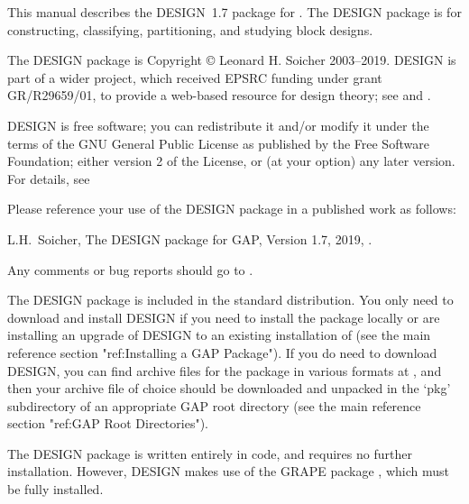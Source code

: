 %
%
%
%
\def\GRAPE{\sf GRAPE}
\def\DESIGN{\sf DESIGN}
\def\GAPDoc{\sf GAPDoc}
\def\nauty{\it nauty}
\def\Aut{{\rm Aut}\,} 


This manual describes the {\DESIGN}~1.7 package for {\GAP}.  The {\DESIGN}
package is for constructing, classifying, partitioning, and studying
block designs. 

The {\DESIGN} package is Copyright {\copyright} Leonard H. Soicher
2003--2019.  {\DESIGN} is part of a wider project, which received EPSRC
funding under grant GR/R29659/01, to provide a web-based resource for
design theory; see  and \cite{Dotw}.

{\DESIGN} is free software; you can redistribute it and/or modify
it under the terms of the GNU General Public License as published by
the Free Software Foundation; either version 2 of the License, or
(at your option) any later version. For details, see 

Please reference your use of the {\DESIGN} package in a published work
as follows:

L.H.~Soicher, The DESIGN package for GAP, Version 1.7, 2019,
.

Any comments or bug reports should go to
.


The {\DESIGN} package is included in the standard {\GAP}
distribution. You only need to download and install {\DESIGN} if you need
to install the package locally or are installing an upgrade of {\DESIGN}
to an existing installation of {\GAP} (see the main {\GAP} reference
section "ref:Installing a GAP Package").  If you do need to download
{\DESIGN}, you can find archive files for the package in various formats
at , and then your
archive file of choice should be downloaded and unpacked in the `pkg'
subdirectory of an appropriate GAP root directory (see the main {\GAP}
reference section "ref:GAP Root Directories").

The {\DESIGN} package is written entirely in {\GAP} code, and requires
no further installation.  However, {\DESIGN} makes use of the {\GRAPE}
package \cite{Grape}, which must be fully installed.

